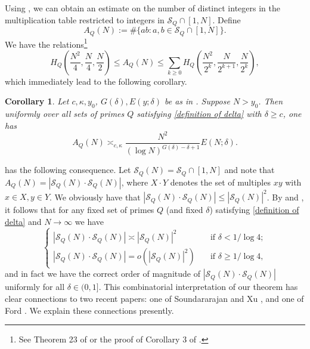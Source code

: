 \documentclass{amsart}
\newtheorem{cor}[theorem]{Corollary}
\theoremstyle{definition}
\numberwithin{equation}{section}
\renewcommand{\S}{\mathcal{S}}
\newcommand{\density}{\delta}
\begin{document}
	Using , we can obtain an estimate on the number of distinct integers in the multiplication table restricted to integers in $\S_Q \cap [1,N]$. Define
	$$A_Q(N) := \#\{ab: a,b \in \S_Q\cap[1,N]\}.$$
	We have the relations\footnote{See Theorem 23 of \cite{hall1988divisors} or the proof of Corollary 3 of \cite{ford2008distribution}.}
	\begin{equation}
		H_Q\left(\frac{N^2}{4},\frac{N}{4},\frac{N}{2} \right) \leq A_Q(N)  \leq \sum_{k \geq 0} H_Q\left(\frac{N^2}{2^k},\frac{N}{2^{k+1}},\frac{N}{2^k} \right),
	\end{equation}
	which immediately lead to the following corollary.
	\begin{cor} \label{maincor} Let $c,\kappa,y_0$, $G(\density),E(y;\density)$ be as in . Suppose $N > y_0$. Then uniformly over all sets of primes $Q$ satisfying \eqref{definition of delta} with $\delta \ge c$, one has
		\begin{equation}
		A_Q(N) \asymp_{c,\kappa} \frac{N^2}{(\log N)^{G(\density) - \density +1}}E(N;\density).
	\end{equation}
	\end{cor}
	 has the following consequence. Let $\S_Q(N) = \S_Q \cap [1,N]$ and note that $A_Q(N) = |\S_Q(N) \cdot \S_Q(N)|$, where $X \cdot Y$ denotes the set of multiples $xy$ with $x \in X, y\in Y$. We obviously have that $|\S_Q(N) \cdot \S_Q(N)| \le |\S_Q(N)|^2$. By  and , it follows that for any fixed set of primes $Q$ (and fixed $\delta$) satisfying \eqref{definition of delta} and $N \to \infty$ we have
	\begin{equation}\label{comb inter}
		 \begin{cases}
		|\S_Q(N) \cdot \S_Q(N)| \asymp	|\S_Q(N)|^2 \quad &\text{if } \density< 1/\log 4;\\|\S_Q(N) \cdot \S_Q(N)| = o(|\S_Q(N)|^2) \quad &\text{if } \density \geq 1/\log 4,
		\end{cases}
	\end{equation}
	and in fact we have the correct order of magnitude of $|\S_Q(N) \cdot \S_Q(N)|$ uniformly for all $\delta \in (0,1]$. This combinatorial interpretation of our theorem has clear connections to two recent papers: one of Soundararajan and Xu \cite{soundararajan2023central}, and one of Ford \cite{ford2018extremal}. We explain these connections presently.
	
\end{document}
